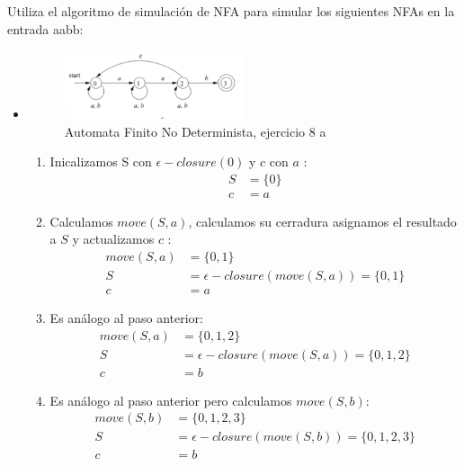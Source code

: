 \newpage
\begin{Pro}
    Utiliza el algoritmo de simulación de NFA para simular los siguientes NFAs en la entrada aabb:
\end{Pro}

\begin{itemize}
    \item
    \begin{figure}[h!]
        \centering
        \includegraphics[width=0.5\textwidth]{images/8a.png}
        \caption{Automata Finito No Determinista, ejercicio 8 a}
    \end{figure}
    \begin{enumerate}
        \item Inicalizamos S con $\epsilon - closure (0)$ y $c$ con $a$ :
        \begin{align*}
            S &= \{0\} \\
            c &= a
        \end{align*}
        \item Calculamos $move(S, a)$, calculamos su cerradura asignamos el resultado a $S$ y actualizamos $c$ :
        \begin{align*}
            move(S, a) &= \{0, 1\} \\
            S &= \epsilon-closure (move(S, a)) = \{0, 1\} \\
            c &= a
        \end{align*}
        \item Es análogo al paso anterior:
        \begin{align*}
            move(S, a) &= \{0, 1, 2\} \\
            S &= \epsilon-closure (move(S, a)) = \{0, 1, 2\} \\
            c &= b
        \end{align*}
        \item Es análogo al paso anterior pero calculamos $move(S, b)$:
        \begin{align*}
            move(S, b) &= \{0, 1, 2, 3\} \\
            S &= \epsilon-closure (move(S, b)) = \{0, 1, 2, 3\} \\
            c &= b
        \end{align*}

\end{enumerate}
\end{itemize}
